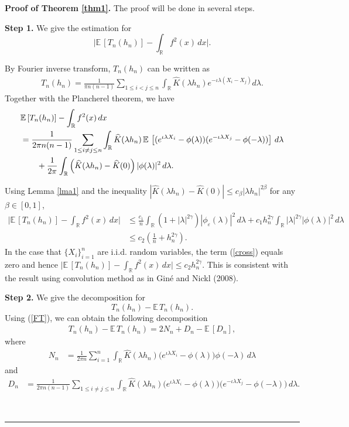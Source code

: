 \documentclass[11pt]{article}
\newenvironment{proof}[1][Proof]{\textbf{#1.} }{\
\rule{0.5em}{0.5em}}
\def\R{{\mathbb R}}
\def\E{{{\mathbb E}\,}}
\begin{document}
\noindent
\begin{proof}[Proof of Theorem \ref{thm1}] The proof will be done in several steps.


\medskip \noindent
\textbf{Step 1.}
We give the estimation for
\[
\Big|\E[T_n(h_n)]-\int_{\R} f^2(x)\, dx \Big|.
\] 

By Fourier inverse transform, $T_n(h_n)$ can be written as 
\begin{align}\label{FT}
T_n(h_n)
=\frac{1}{\pi n(n-1)}\sum_{1\leq i< j\leq n} \int_{\R}\widehat{K}(\lambda h_n)e^{-\iota \lambda (X_i-X_j)}d\lambda. 
\end{align}
Together with the Plancherel theorem,  we have  
\begin{align}
&\E[T_n(h_n)]-\int_{\R} f^2(x)\, dx\notag\\
&=\frac{1}{2\pi n(n-1)}\sum_{1\leq i\neq j\leq n} \int_{\R}\widehat{K}(\lambda h_n) \, \E\left[ (e^{\iota \lambda X_i}-\phi(\lambda))(e^{-\iota \lambda  X_j}-\phi(-\lambda))\right]\, d\lambda \label{cross}\\
&\qquad+ \frac{1}{2\pi}\int_{\R}\left(\widehat{K}(\lambda h_n)-\widehat{K}(0)\right)|\phi(\lambda)|^2\, d\lambda.\notag
\end{align}

Using Lemma \ref{lma1} and the inequality $|\widehat{K}(\lambda h_n)-\widehat{K}(0)|\leq c_{\beta} |\lambda h_n|^{2\beta}$ for any $\beta\in[0,1]$,
\begin{align*}
\Big| \E[T_n(h_n)]-\int_{\R} f^2(x)\, dx \Big| 
&\leq \frac{c_1}{n} \int_{\R}(1+|\lambda|^{2\gamma})| \phi_{\varepsilon}(\lambda)|^2 \, d\lambda+c_1  h^{2\gamma}_n\int_{\R}|\lambda|^{2\gamma}|\phi(\lambda)|^{2}\, d\lambda\\
&\leq c_2\left(\frac{1}{n}+h^{2\gamma}_n\right).
\end{align*}
In the case that $\{X_i\}_{i=1}^n$ are i.i.d. random variables, the term (\ref{cross}) equals zero and hence
$\Big| \E[T_n(h_n)]-\int_{\R} f^2(x)\, dx \Big|  \leq c_2h^{2\gamma}_n$. This is consistent with the result using convolution method as in Gin\'{e} and Nickl (2008).
\medskip


\medskip \noindent
\textbf{Step 2.} We give the decomposition for 
\[
T_n(h_n)-\E T_n(h_n).
\] 
Using (\ref{FT}),  we can obtain the following decomposition
\begin{align} \label{decomp}
T_n(h_n)-\E T_n(h_n)=2N_n+D_n-\E [D_n],
\end{align}
where 
\begin{align*}
N_n&=\frac{1}{2\pi n}\sum^n_{i=1}\int_{\R} \widehat{K}(\lambda h_n) \big(e^{\iota \lambda X_i}-\phi(\lambda) \big) \phi(-\lambda) \, d\lambda
\end{align*}
and
\begin{align*}
D_n&=\frac{1}{2\pi n(n-1)}\sum_{1\leq i\neq j\leq n}\int_{\R} \widehat{K}(\lambda h_n)\big(e^{\iota \lambda  X_i}-\phi(\lambda) \big)\big(e^{-\iota \lambda  X_j}-\phi(-\lambda) \big) \, d\lambda.
\end{align*}


\end{proof}
\end{document}
